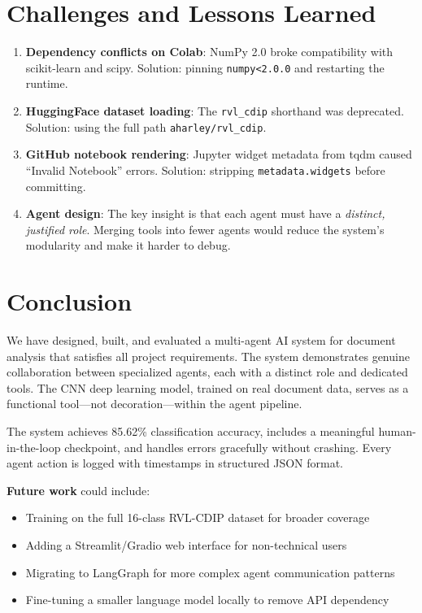 \documentclass[12pt,a4paper]{article}
\begin{document}
\section{Challenges and Lessons Learned}

\begin{enumerate}
    \item \textbf{Dependency conflicts on Colab}: NumPy 2.0 broke compatibility with scikit-learn and scipy. Solution: pinning \texttt{numpy<2.0.0} and restarting the runtime.
    \item \textbf{HuggingFace dataset loading}: The \texttt{rvl\_cdip} shorthand was deprecated. Solution: using the full path \texttt{aharley/rvl\_cdip}.
    \item \textbf{GitHub notebook rendering}: Jupyter widget metadata from tqdm caused ``Invalid Notebook'' errors. Solution: stripping \texttt{metadata.widgets} before committing.
    \item \textbf{Agent design}: The key insight is that each agent must have a \textit{distinct, justified role}. Merging tools into fewer agents would reduce the system's modularity and make it harder to debug.
\end{enumerate}

\section{Conclusion}

We have designed, built, and evaluated a multi-agent AI system for document analysis that satisfies all project requirements. The system demonstrates genuine collaboration between specialized agents, each with a distinct role and dedicated tools. The CNN deep learning model, trained on real document data, serves as a functional tool---not decoration---within the agent pipeline.

The system achieves 85.62\% classification accuracy, includes a meaningful human-in-the-loop checkpoint, and handles errors gracefully without crashing. Every agent action is logged with timestamps in structured JSON format.

\textbf{Future work} could include:
\begin{itemize}
    \item Training on the full 16-class RVL-CDIP dataset for broader coverage
    \item Adding a Streamlit/Gradio web interface for non-technical users
    \item Migrating to LangGraph for more complex agent communication patterns
    \item Fine-tuning a smaller language model locally to remove API dependency
\end{itemize}
\end{document}
